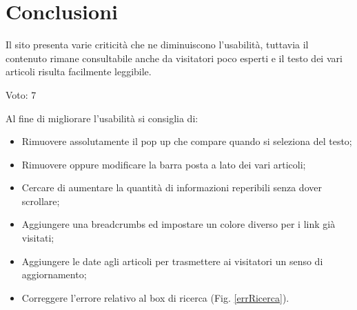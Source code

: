 \section{Conclusioni}
Il sito presenta varie criticità che ne diminuiscono l'usabilità, tuttavia il contenuto rimane consultabile anche da visitatori poco esperti e il testo dei vari articoli risulta facilmente leggibile.\\
\begin{center}
\begin{Large}
Voto: 7
\end{Large}
\end{center}
\vspace{1em}
Al fine di migliorare l'usabilità si consiglia di:
\begin{itemize}
\item Rimuovere assolutamente il pop up che compare quando si seleziona del testo;
\item Rimuovere oppure modificare la barra posta a lato dei vari articoli;
\item Cercare di aumentare la quantità di informazioni reperibili senza dover scrollare;
\item Aggiungere una breadcrumbs ed impostare un colore diverso per i link già visitati;
\item Aggiungere le date agli articoli per trasmettere ai visitatori un senso di aggiornamento;
\item Correggere l'errore relativo al box di ricerca (Fig. \ref{errRicerca}).
\end{itemize}
